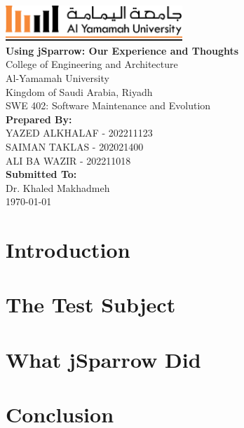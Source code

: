 \documentclass[a4paper,12pt]{article}
\def\maketitle{
  \begin{titlepage}
    \centering
    \vspace*{-1cm}
    \includegraphics[width=0.5\textwidth]{yu-logo.png}\\[2cm]
    {\huge\bfseries Using jSparrow: Our Experience and Thoughts}\\[2cm]
    {\Large College of Engineering and Architecture}\\
    {Al-Yamamah University}\\
    {Kingdom of Saudi Arabia, Riyadh}\\[1cm]
    SWE 402: Software Maintenance and Evolution\\[2cm]
    {\large\bfseries Prepared By:}\\[0.3cm]
    YAZED ALKHALAF - 202211123\\
    SAIMAN TAKLAS - 202021400\\
    ALI BA WAZIR  - 202211018\\
    [2cm]
    {\large\bfseries Submitted To:}\\[0.3cm]
    Dr. Khaled Makhadmeh\\[2cm]
    {\large \today}
    \vfill
  \end{titlepage}
}
\begin{document}
\maketitle

\section{Introduction}

\section{The Test Subject}

\section{What jSparrow Did}

\section{Conclusion}
\end{document}
